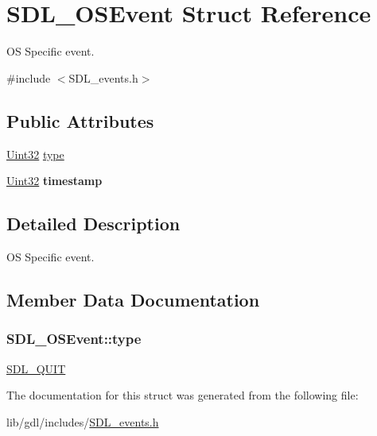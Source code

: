\hypertarget{struct_s_d_l___o_s_event}{}\section{S\+D\+L\+\_\+\+O\+S\+Event Struct Reference}
\label{struct_s_d_l___o_s_event}


O\+S Specific event.  




{\ttfamily \#include $<$S\+D\+L\+\_\+events.\+h$>$}

\subsection*{Public Attributes}
\begin{DoxyCompactItemize}
\item 
\hyperlink{_s_d_l__stdinc_8h_add440eff171ea5f55cb00c4a9ab8672d}{Uint32} \hyperlink{struct_s_d_l___o_s_event_a85a600619ebebc8db007fc757b3895a5}{type}
\item 
\hypertarget{struct_s_d_l___o_s_event_a8b2480eefadad9f3f8c94f8e550b7fb0}{}\hyperlink{_s_d_l__stdinc_8h_add440eff171ea5f55cb00c4a9ab8672d}{Uint32} {\bfseries timestamp}\label{struct_s_d_l___o_s_event_a8b2480eefadad9f3f8c94f8e550b7fb0}

\end{DoxyCompactItemize}


\subsection{Detailed Description}
O\+S Specific event. 

\subsection{Member Data Documentation}
\hypertarget{struct_s_d_l___o_s_event_a85a600619ebebc8db007fc757b3895a5}{}
\subsubsection[{type}]{ S\+D\+L\+\_\+\+O\+S\+Event\+::type}\label{struct_s_d_l___o_s_event_a85a600619ebebc8db007fc757b3895a5}
\hyperlink{_s_d_l__events_8h_a3b589e89be6b35c02e0dd34a55f3fccaa31acc5fdafc86ebe2c1f5c3cae48d603}{S\+D\+L\+\_\+\+Q\+U\+I\+T} 

The documentation for this struct was generated from the following file\+:\begin{DoxyCompactItemize}
\item 
lib/gdl/includes/\hyperlink{_s_d_l__events_8h}{S\+D\+L\+\_\+events.\+h}\end{DoxyCompactItemize}
